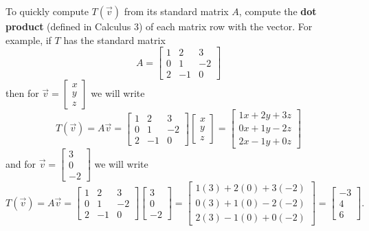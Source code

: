 \begin{applicationActivities}
\begin{fact}
  To quickly compute \(T(\vec v)\) from its standard matrix \(A\),
  compute the \textbf{dot product} (defined in Calculus 3) of each matrix row
  with the vector. For example, if \(T\) has the standard matrix
  \[
    A = \begin{bmatrix} 1 & 2 & 3 \\ 0 & 1 & -2 \\ 2 & -1 & 0 \end{bmatrix}
  \]
  then for \(\vec v=\begin{bmatrix}x\\y\\z\end{bmatrix}\) we will write
  \[
    T(\vec v)
      =
    A\vec v
      =
    \begin{bmatrix} 1 & 2 & 3 \\ 0 & 1 & -2 \\ 2 & -1 & 0 \end{bmatrix}
    \begin{bmatrix}x\\y\\z\end{bmatrix}
      =
    \begin{bmatrix}
      1x+2y+3z\\
      0x+1y-2z\\
      2x-1y+0z
    \end{bmatrix}
  \]
  and for \(\vec v=\begin{bmatrix}3\\0\\-2\end{bmatrix}\) we will write
  \[
    T(\vec v)
      =
    A\vec v
      =
    \begin{bmatrix} 1 & 2 & 3 \\ 0 & 1 & -2 \\ 2 & -1 & 0 \end{bmatrix}
    \begin{bmatrix}3\\0\\-2\end{bmatrix}
      =
    \begin{bmatrix}
      1(3)+2(0)+3(-2)\\
      0(3)+1(0)-2(-2)\\
      2(3)-1(0)+0(-2)
    \end{bmatrix}
      =
    \begin{bmatrix}
      -3\\
      4\\
      6
    \end{bmatrix}
  .\]
\end{fact}


\end{applicationActivities}
